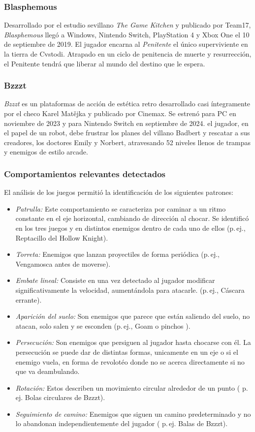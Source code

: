 \subsubsection{Blasphemous}
Desarrollado por el estudio sevillano \emph{The Game Kitchen} y publicado por Team17, \textit{Blasphemous} llegó a Windows, Nintendo Switch, PlayStation 4 y Xbox One el 10 de septiembre de 2019. El jugador encarna al \textit{Penitente} el único superviviente en la tierra de Cvstodi. Atrapado en un ciclo de penitencia de muerte y resurrección, el Penitente tendrá que liberar al mundo del destino que le espera.

\subsubsection{Bzzzt}

\textit{Bzzzt} es un plataformas de acción de estética retro desarrollado casi íntegramente por el checo Karel Matějka  y publicado por Cinemax. Se estrenó para PC en noviembre de 2023 y para Nintendo Switch en septiembre de 2024. el jugador, en el papel de un robot, debe frustrar los planes del villano Badbert y rescatar a sus creadores, los doctores Emily y Norbert, atravesando 52 niveles llenos de trampas y enemigos de estilo arcade.

\subsubsection{Comportamientos relevantes detectados}
El análisis de los juegos permitió la identificación de los siguientes patrones:  
\begin{itemize}
  \item \emph{Patrulla:} Este comportamiento se caracteriza por caminar a un ritmo constante en el eje horizontal, cambiando de dirección al chocar. Se identificó en los tres juegos y en distintos enemigos dentro de cada uno de ellos (p.\,ej., Reptacillo del Hollow Knight).  
  \item \emph{Torreta:} Enemigos que lanzan proyectiles de forma periódica  (p.\,ej., Vengamosca antes de moverse).  
  \item \emph{Embate lineal:} Consiste en una vez detectado al jugador modificar significativamente la velocidad, aumentándola para atacarle. (p.\,ej., Cáscara errante).  
  \item \emph{Aparición del suelo:} Son enemigos que parece que están saliendo del suelo, no atacan, solo salen y se esconden (p.\,ej., Goam o pinchos ).  
  \item \emph{Persecución:} Son enemigos que persiguen al jugador hasta chocarse con él. La persecución se puede dar de distintas formas, unicamente en un eje o si el enemigo vuela, en forma de revolotéo donde no se acerca directamente si no que va deambulando.
  \item \emph{Rotación:} Estos describen un movimiento circular alrededor de un punto ( p.\,ej. Bolas circulares de Bzzzt).
  \item \emph{Seguimiento de camino:} Enemigos que siguen un camino predeterminado y no lo abandonan independientemente del jugador ( p.\,ej. Balas de Bzzzt).
\end{itemize}


